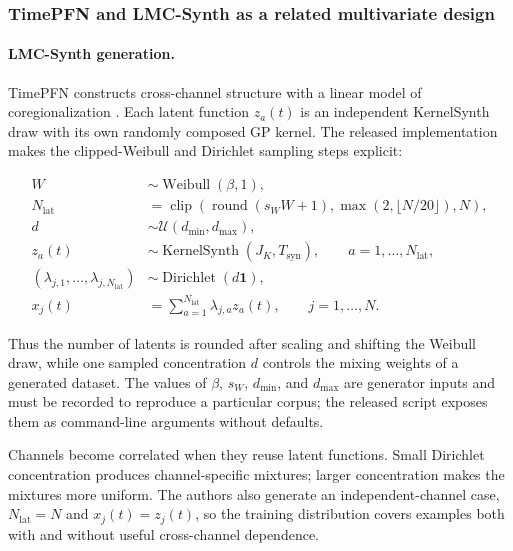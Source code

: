 \subsubsection{TimePFN and LMC-Synth as a related multivariate design}

\paragraph{LMC-Synth generation.}
TimePFN constructs cross-channel structure with a linear model of
coregionalization \citep{taga2025timepfn}. Each latent function $z_a(t)$ is an
independent KernelSynth draw with its own randomly composed GP kernel. The
released implementation makes the clipped-Weibull and Dirichlet sampling
steps explicit:

\begin{equation}
\begin{aligned}
W&\sim\operatorname{Weibull}(\beta,1),\\
N_{\mathrm{lat}}
    &=\operatorname{clip}\!\left(
      \operatorname{round}(s_W W+1),
      \max(2,\lfloor N/20\rfloor),N\right),\\
d&\sim\mathcal U(d_{\min},d_{\max}),\\
z_a(t)&\sim\operatorname{KernelSynth}(J_K,T_{\mathrm{syn}}),
      \qquad a=1,\ldots,N_{\mathrm{lat}},\\
(\lambda_{j,1},\ldots,\lambda_{j,N_{\mathrm{lat}}})
    &\sim\operatorname{Dirichlet}(d\mathbf 1),\\
x_j(t)&=\sum_{a=1}^{N_{\mathrm{lat}}}\lambda_{j,a}z_a(t),
      \qquad j=1,\ldots,N.
\end{aligned}
\label{eq:lmc-synth}
\end{equation}

Thus the number of latents is rounded after scaling and shifting the Weibull
draw, while one sampled concentration $d$ controls the mixing weights of a
generated dataset. The values of $\beta$, $s_W$, $d_{\min}$, and $d_{\max}$
are generator inputs and must be recorded to reproduce a particular corpus;
the released script exposes them as command-line arguments without defaults.

Channels become correlated when they reuse latent functions. Small Dirichlet
concentration produces channel-specific mixtures; larger concentration makes
the mixtures more uniform. The authors also generate an independent-channel
case, $N_{\mathrm{lat}}=N$ and $x_j(t)=z_j(t)$, so the training distribution
covers examples both with and without useful cross-channel dependence.

